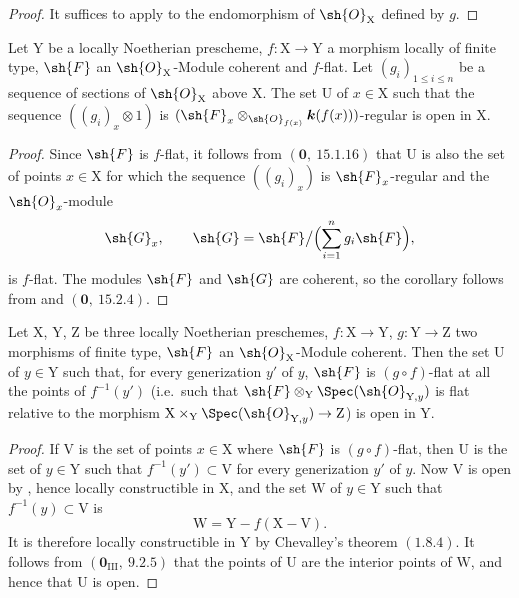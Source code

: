 \begin{proof}
It suffices to apply  to the endomorphism of $\sh{O}_\mathrm{X}$ defined by $g$.
\end{proof}

\begin{corollary}[11.1.4]
\label{IV.11.1.4}
Let $\mathrm{Y}$ be a locally Noetherian prescheme, $f:\mathrm{X}\to\mathrm{Y}$ a morphism locally of finite type, $\sh{F}$ an $\sh{O}_\mathrm{X}$-Module coherent and $f$-flat. Let $(g_i)_{1\leqslant i\leqslant n}$ be a sequence of sections of $\sh{O}_\mathrm{X}$ above $\mathrm{X}$. The set $\mathrm{U}$ of $x\in\mathrm{X}$ such that the sequence $((g_i)_x\otimes 1)$ is $(\sh{F}_x\otimes_{\sh{O}_{f(x)}}\boldsymbol{k}(f(x)))$-regular is open in $\mathrm{X}$.
\end{corollary}

\begin{proof}
Since $\sh{F}$ is $f$-flat, it follows from
$(\mathbf{0},~15.1.16)$ that $\mathrm{U}$ is also the set of points
$x\in\mathrm{X}$ for which the sequence $((g_i)_x)$ is
$\sh{F}_x$-regular and the $\sh{O}_x$-module
\[
  \sh{G}_x,\qquad
  \sh{G}=\sh{F}\big/\Bigl(\sum_{i=1}^n g_i\sh{F}\Bigr),
\]
is $f$-flat. The modules $\sh{F}$ and $\sh{G}$ are coherent, so the
corollary follows from  and
$(\mathbf{0},~15.2.4)$.
\end{proof}

\begin{corollary}[11.1.5]
\label{IV.11.1.5}
Let $\mathrm{X}$, $\mathrm{Y}$, $\mathrm{Z}$ be three locally Noetherian preschemes, $f:\mathrm{X}\to\mathrm{Y}$, $g:\mathrm{Y}\to\mathrm{Z}$ two morphisms of finite type, $\sh{F}$ an $\sh{O}_\mathrm{X}$-Module coherent. Then the set $\mathrm{U}$ of $y\in\mathrm{Y}$ such that, for every generization $y'$ of $y$, $\sh{F}$ is $(g\circ f)$-flat at all the points of $f^{-1}(y')$ (i.e.\ such that $\sh{F}\otimes_\mathrm{Y}\Spec(\sh{O}_{\mathrm{Y},y})$ is flat relative to the morphism $\mathrm{X}\times_\mathrm{Y}\Spec(\sh{O}_{\mathrm{Y},y})\to\mathrm{Z}$) is open in $\mathrm{Y}$.
\end{corollary}

\begin{proof}
If $\mathrm{V}$ is the set of points $x\in\mathrm{X}$ where $\sh{F}$ is
$(g\circ f)$-flat, then $\mathrm{U}$ is the set of $y\in\mathrm{Y}$ such
that $f^{-1}(y')\subset\mathrm{V}$ for every generization $y'$ of $y$.
Now $\mathrm{V}$ is open by , hence locally
constructible in $\mathrm{X}$, and the set $\mathrm{W}$ of
$y\in\mathrm{Y}$ such that $f^{-1}(y)\subset\mathrm{V}$ is
\[
  \mathrm{W}=\mathrm{Y}-f(\mathrm{X}-\mathrm{V}).
\]
It is therefore locally constructible in $\mathrm{Y}$ by Chevalley's
theorem $(1.8.4)$. It follows from
$(\mathbf{0}_{\mathrm{III}},~9.2.5)$ that the points of $\mathrm{U}$ are
the interior points of $\mathrm{W}$, and hence that $\mathrm{U}$ is open.
\end{proof}

